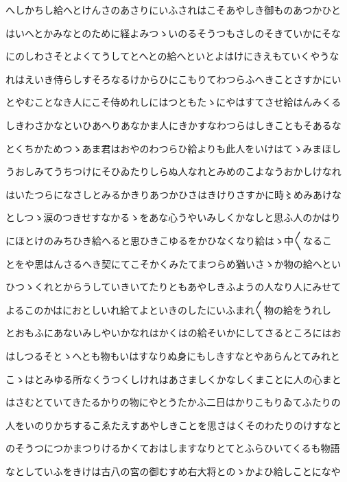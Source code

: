 \documentclass[a4paper,11pt,landscape]{ltjtarticle}
\begin{document}
へしかちし給へとけんさのあさりにいふされはこそあやしき御ものあつかひと
\par\medskip
はいへとかみなとのために経よみつゝいのるそうつもさしのそきていかにそな
\par\medskip
にのしわさそとよくてうしてとへとの給へといとよはけにきえもていくやうな
\par\medskip
れはえいき侍らしすそろなるけからひにこもりてわつらふへきことさすかにい
\par\medskip
とやむことなき人にこそ侍めれしにはつともたゝにやはすてさせ給はんみくる
\par\medskip
しきわさかなといひあへりあなかま人にきかすなわつらはしきこともそあるな
\par\medskip
とくちかためつゝあま君はおやのわつらひ給よりも此人をいけはてゝみまほし
\par\medskip
うおしみてうちつけにそひゐたりしらぬ人なれとみめのこよなうおかしけなれ
\par\medskip
はいたつらになさしとみるかきりあつかひさはきけりさすかに時〻めみあけな
\par\medskip
としつゝ涙のつきせすなかるゝをあな心うやいみしくかなしと思ふ人のかはり
\par\medskip
にほとけのみちひき給へると思ひきこゆるをかひなくなり給はゝ中〱なるこ
\par\medskip
とをや思はんさるへき契にてこそかくみたてまつらめ猶いさゝか物の給へとい
\par\medskip
ひつゝくれとからうしていきいてたりともあやしきふようの人なり人にみせて
\par\medskip
よるこのかはにおとしいれ給てよといきのしたにいふまれ〱物の給をうれし
\par\medskip
とおもふにあないみしやいかなれはかくはの給そいかにしてさるところにはお
\par\medskip
はしつるそとゝへとも物もいはすなりぬ身にもしきすなとやあらんとてみれと
\par\medskip
こゝはとみゆる所なくうつくしけれはあさましくかなしくまことに人の心まと
\par\medskip
はさむとていてきたるかりの物にやとうたかふ二日はかりこもりゐてふたりの
\par\medskip
人をいのりかちするこゑたえすあやしきことを思さはくそのわたりのけすなと
\par\medskip
のそうつにつかまつりけるかくておはしますなりとてとふらひいてくるも物語
\par\medskip
なとしていふをきけは古八の宮の御むすめ右大将とのゝかよひ給しことになや
\par\medskip
\end{document}
